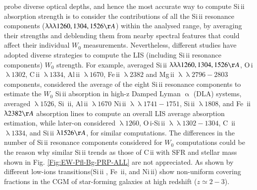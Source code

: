 \documentclass[longauth]{aa}
\begin{document}
probe diverse optical depths, and hence the most accurate way to compute
Si\,{\sc ii} absorption strength is to consider the contributions of all the
Si\,{\sc ii} resonance components ($\uplambda\uplambda\uplambda 1260, 1304,
1526\AA$) within the analysed range, by averaging their strengths and
deblending them from nearby spectral features that could affect their
individual $W_{0}$ measurements. Nevertheless, different studies have
adopted diverse strategies to compute the LIS (including Si\,{\sc ii}
resonance components) $W_{0}$ strength. For example, \cite{Jones18} averaged
Si\,{\sc ii} $\uplambda\uplambda\uplambda 1260, 1304, 1526\AA$, O\,{\sc i}
$\uplambda 1302$, C\,{\sc ii} $\uplambda 1334$, Al\,{\sc ii} $\uplambda
1670$, Fe\,{\sc ii} $\uplambda 2382$ and Mg\,{\sc ii} $\uplambda\uplambda
2796-2803$ components, 
\cite{Ranjan22} considered the average of the eight Si\,{\sc ii} resonance
components to estimate the $W_{0}$ Si\,{\sc ii}  absorption in high-z Damped
Lyman $\upalpha$ (DLA) systems, \cite{Du16} averaged $\uplambda 1526$, Si\,
{\sc ii}, Al\,{\sc ii} $\uplambda 1670$ Ni\,{\sc ii}
$\uplambda\uplambda1741-1751$, Si\,{\sc ii} $\uplambda 1808$, and Fe\,
{\sc ii} $\uplambda 2382 \AA$ absorption lines to compute an overall LIS
average absorption estimation, while later-on \cite{Du18} considered
$\uplambda 1260$, O\,{\sc i}-Si\,{\sc ii} $\uplambda\uplambda1302-1304$, C\,
{\sc ii} $\uplambda 1334$, and Si\,{\sc ii} $\uplambda 1526 \AA$, for
similar computations. The differences in the number of Si\,{\sc ii}
resonance components considered for $W_{0}$ computations could be the reason
why similar Si\,{\sc ii} trends as those of C\,{\sc ii} with SFR and stellar
mass  shown in Fig. \ref{Fig:EW-Pfl-Bg-PRP-ALL} are not appreciated. As
shown by \cite{Jones18} different low-ions transitions(Si\,{\sc ii} , Fe\,
{\sc ii}, and Ni\,{\sc ii}) show non-uniform covering fractions in the CGM
of star-forming galaxies at high redshift ($z\simeq2-3$).
\end{document}
